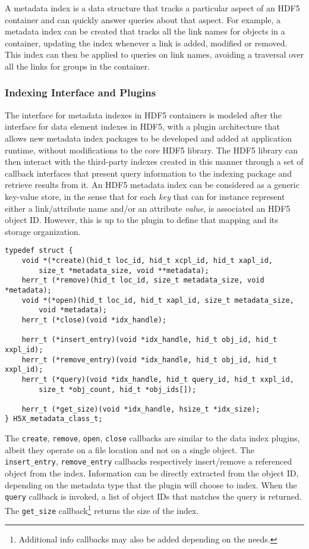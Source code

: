 A metadata index is a data structure that tracks a particular aspect of an HDF5 container 
and can quickly answer queries about that aspect. For example, a metadata index can 
be created that tracks all the link names for objects in a container, updating the index 
whenever a link is added, modified or removed. This index can then be applied to 
queries on link names, avoiding a traversal over all the links for groups in the container.

\subsubsection{Indexing Interface and Plugins}

The interface for metadata indexes in HDF5 containers is modeled after the interface 
for data element indexes in HDF5, with a plugin architecture that allows new metadata 
index packages to be developed and added at application runtime, without modifications 
to the core HDF5 library.
The HDF5 library can then interact with the third-party indexes created in this manner 
through a set of callback interfaces that present query information to the
indexing package and retrieve results from it.
An HDF5 metadata index can be considered as a generic key-value store, in the
sense that for each \textit{key} that can for instance represent either a
link/attribute name and/or an attribute \textit{value}, is associated an HDF5
object ID. However, this is up to the plugin to define that mapping and its
storage organization.

{
\begin{lstlisting}
typedef struct {
    void *(*create)(hid_t loc_id, hid_t xcpl_id, hid_t xapl_id,
        size_t *metadata_size, void **metadata);
    herr_t (*remove)(hid_t loc_id, size_t metadata_size, void *metadata);
    void *(*open)(hid_t loc_id, hid_t xapl_id, size_t metadata_size,
        void *metadata);
    herr_t (*close)(void *idx_handle);

    herr_t (*insert_entry)(void *idx_handle, hid_t obj_id, hid_t xxpl_id);
    herr_t (*remove_entry)(void *idx_handle, hid_t obj_id, hid_t xxpl_id);
    herr_t (*query)(void *idx_handle, hid_t query_id, hid_t xxpl_id,
        size_t *obj_count, hid_t *obj_ids[]);

    herr_t (*get_size)(void *idx_handle, hsize_t *idx_size);
} H5X_metadata_class_t;
\end{lstlisting}
}

The \texttt{create}, \texttt{remove}, \texttt{open}, \texttt{close} callbacks
are similar to the data index plugins, albeit they operate on a file location and
not on a single object. The \texttt{insert\_entry}, \texttt{remove\_entry} callbacks
respectively insert/remove a referenced object from the index. Information can
be directly extracted from the object ID, depending on the metadata type that
the plugin will choose to index.
When the \texttt{query} callback is invoked, a list of object IDs that matches
the query is returned. The \texttt{get\_size} callback\footnote{Additional info
callbacks may also be added depending on the needs.} returns the size of the index.

